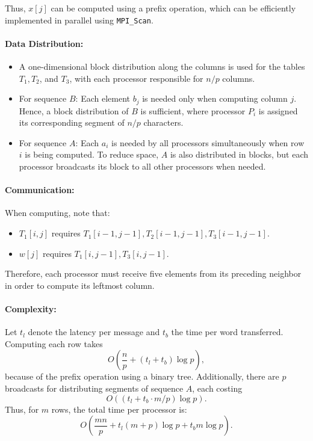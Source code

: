 \documentclass[12pt]{book}
\begin{document}
Thus, $x[j]$ can be computed using a prefix operation, which can be efficiently implemented in parallel using \texttt{MPI\_Scan}.

\paragraph{Data Distribution:}
\begin{itemize}
    \item A one-dimensional block distribution along the columns is used for the tables $T_1, T_2$, and $T_3$, with each processor responsible for $n/p$ columns.
    \item For sequence $B$: Each element $b_j$ is needed only when computing column $j$. Hence, a block distribution of $B$ is sufficient, where processor $P_i$ is assigned its corresponding segment of $n/p$ characters.
    \item For sequence $A$: Each $a_i$ is needed by all processors simultaneously when row $i$ is being computed. To reduce space, $A$ is also distributed in blocks, but each processor broadcasts its block to all other processors when needed.
\end{itemize}

\paragraph{Communication:}
When computing, note that:
\begin{itemize}
    \item $T_1[i,j]$ requires $T_1[i-1,j-1], T_2[i-1,j-1], T_3[i-1,j-1]$.
    \item $w[j]$ requires $T_1[i,j-1], T_3[i,j-1]$.
\end{itemize}
Therefore, each processor must receive five elements from its preceding neighbor in order to compute its leftmost column.

\paragraph{Complexity:}
Let $t_l$ denote the latency per message and $t_b$ the time per word transferred. Computing each row takes
\[
O\left(\frac{n}{p} + (t_l + t_b)\log p\right),
\]
because of the prefix operation using a binary tree. Additionally, there are $p$ broadcasts for distributing segments of sequence $A$, each costing
\[
O\left((t_l + t_b\cdot m/p)\log p\right).
\]
Thus, for $m$ rows, the total time per processor is:
\[
O\left(\frac{mn}{p} + t_l(m+p)\log p + t_bm\log p\right).
\]
\end{document}
